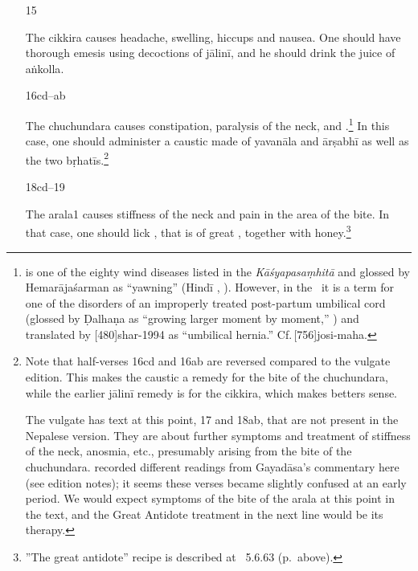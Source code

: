 \begin{translation}
\begin{itemize}
\item[15]

The \Gls{cikkira} causes headache, swelling, hiccups and nausea.  One
should have thorough emesis using
decoctions of \gls{jālinī}, and he should drink
the juice of \gls{aṅkolla}.

\item[16cd--ab]

The \Gls{chuchundara} causes constipation, paralysis of the neck, and
.\footnote{ is one of the
    eighty wind diseases listed in the \emph{Kāśyapasaṃhitā} and glossed
    by Hemarājaśarman as “yawning” (Hindī ,
    ). However, in the \CS\ it is a term for one
    of the disorders of an improperly treated post-partum umbilical cord
    (glossed by Ḍalhaṇa as  “growing larger
    moment by moment,” ) and translated by
    [480]{shar-1994} as “umbilical hernia.”
    Cf.\,[756]{josi-maha}.} %
    In this case, one should administer a caustic made of
    \gls{yavanāla} and \gls{ārṣabhī} as well as the two
    \glspl{bṛhatī}.\footnote{Note that half-verses 16cd and 16ab are
        reversed compared to the vulgate edition.  This makes the caustic
        a remedy for the bite of the \gls{chuchundara}, while the
        earlier \gls{jālinī} remedy is for the \gls{cikkira}, which makes
        betters sense.
        
        The vulgate has text at this point, 17 and 18ab, that are not
present in the Nepalese version.  They are about further
symptoms and treatment of stiffness of the neck, anosmia,
etc., presumably arising from the bite of the
\gls{chuchundara}.  recorded different
readings from Gayadāsa's commentary here (see edition notes);
it seems these verses became slightly confused at an early
period. We would expect symptoms of the bite of the
\gls{arala} at this point in the text, and the Great Antidote
treatment in the next line would be its therapy.}

    
\item[18cd--19]

The \Gls{arala1} causes stiffness of the neck and pain in the area of the bite.
In that case, one should lick , that
is of great , together with honey.\footnote{”The great
    antidote” recipe is described at \SS\ 5.6.63 (p.\,\pageref{mahāgada}
    above).}


\end{itemize}
\end{translation}
